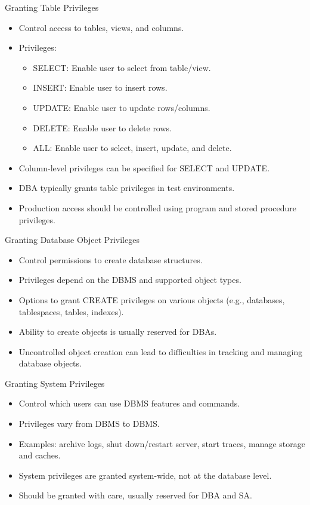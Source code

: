 \documentclass[aspectratio=169]{beamer}
\begin{document}
\begin{frame}{Granting Table Privileges}
  \begin{itemize}
    \item Control access to tables, views, and columns.
    \item Privileges:
      \begin{itemize}
        \item SELECT: Enable user to select from table/view.
        \item INSERT: Enable user to insert rows.
        \item UPDATE: Enable user to update rows/columns.
        \item DELETE: Enable user to delete rows.
        \item ALL: Enable user to select, insert, update, and delete.
      \end{itemize}
    \item Column-level privileges can be specified for SELECT and UPDATE.
\item DBA typically grants table privileges in test environments.
\item Production access should be controlled using program and stored procedure privileges.
\end{itemize}
\end{frame}

\begin{frame}{Granting Database Object Privileges}
    \begin{itemize}
        \item Control permissions to create database structures.
        \item Privileges depend on the DBMS and supported object types.
        \item Options to grant CREATE privileges on various objects (e.g., databases, tablespaces, tables, indexes).
        \item Ability to create objects is usually reserved for DBAs.
        \item Uncontrolled object creation can lead to difficulties in tracking and managing database objects.
    \end{itemize}
\end{frame}

\begin{frame}{Granting System Privileges}
    \begin{itemize}
        \item Control which users can use DBMS features and commands.
        \item Privileges vary from DBMS to DBMS.
        \item Examples: archive logs, shut down/restart server, start traces, manage storage and caches.
        \item System privileges are granted system-wide, not at the database level.
        \item Should be granted with care, usually reserved for DBA and SA.
    \end{itemize}
\end{frame}
\end{document}
